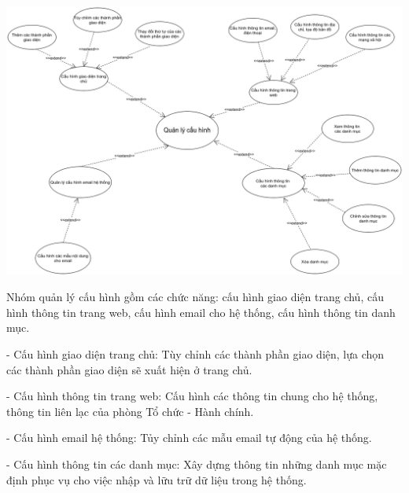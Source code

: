 \begin{center}
  \captionsetup{type=figure}
  \includegraphics[scale=0.4]{img/UML/Admin/quanlycauhinh.png}
\end{center}

Nhóm quản lý cấu hình gồm các chức năng: cấu hình giao diện trang chủ, cấu hình thông tin trang web, cấu hình email cho hệ thống, cấu hình thông tin danh mục.

- Cấu hình giao diện trang chủ: Tùy chỉnh các thành phần giao diện, lựa chọn các thành phần giao diện sẽ xuất hiện ở trang chủ.

- Cấu hình thông tin trang web: Cấu hình các thông tin chung cho hệ thống, thông tin liên lạc của phòng Tổ chức - Hành chính.

- Cấu hình email hệ thống: Tủy chỉnh các mẫu email tự động của hệ thống.

- Cấu hình thông tin các danh mục: Xây dựng thông tin những danh mục mặc định phục vụ cho việc nhập và lữu trữ dữ liệu trong hệ thống.
